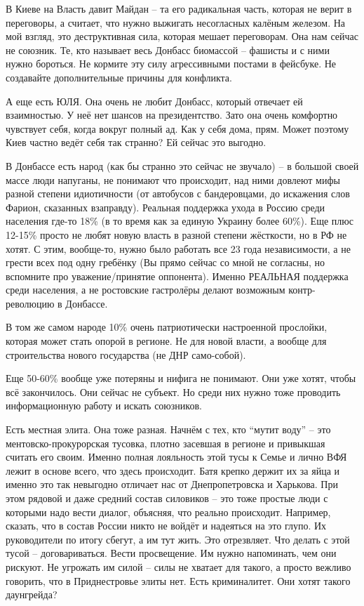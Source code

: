 В Киеве на Власть давит Майдан – та его радикальная часть, которая не верит в
переговоры, а считает, что нужно выжигать несогласных калёным железом. На мой
взгляд, это деструктивная сила, которая мешает переговорам. Она нам сейчас не
союзник. Те, кто называет весь Донбасс биомассой – фашисты и с ними нужно
бороться. Не кормите эту силу агрессивными постами в фейсбуке. Не создавайте
дополнительные причины для конфликта.

А еще есть ЮЛЯ. Она очень не любит Донбасс, который отвечает ей взаимностью. У
неё нет шансов на президентство. Зато она очень комфортно чувствует себя, когда
вокруг полный ад. Как у себя дома, прям. Может поэтому Киев частно ведёт себя
так странно? Ей сейчас это выгодно.

В Донбассе есть народ (как бы странно это сейчас не звучало) – в большой своей
массе люди напуганы, не понимают что происходит, над ними довлеют мифы разной
степени идиотичности (от автобусов с бандеровцами, до искажения слов Фарион,
сказанных взаправду). Реальная поддержка ухода в Россию среди населения где-то
18\% (в то время как за единую Украину более 60\%). Еще плюс 12-15\% просто не
любят новую власть в разной степени жёсткости, но в РФ не хотят. С этим,
вообще-то, нужно было работать все 23 года независимости, а не грести всех под
одну гребёнку (Вы прямо сейчас со мной не согласны, но вспомните про
уважение/принятие оппонента). Именно РЕАЛЬНАЯ поддержка среди населения, а не
ростовские гастролёры делают возможным контр-революцию в Донбассе.

В том же самом народе 10\% очень патриотически настроенной прослойки, которая
может стать опорой в регионе. Не для новой власти, а вообще для строительства
нового государства (не ДНР само-собой).

Еще 50-60\% вообще уже потеряны и нифига не понимают. Они уже хотят, чтобы всё
закончилось. Они сейчас не субъект. Но среди них нужно тоже проводить
информационную работу и искать союзников.

Есть местная элита. Она тоже разная. Начнём с тех, кто “мутит воду” – это
ментовско-прокурорская тусовка, плотно засевшая в регионе и привыкшая считать
его своим. Именно полная лояльность этой тусы к Семье и лично ВФЯ лежит в
основе всего, что здесь происходит. Батя крепко держит их за яйца и именно это
так невыгодно отличает нас от Днепропетровска и Харькова. При этом рядовой и
даже средний состав силовиков – это тоже простые люди с которыми надо вести
диалог, объясняя, что реально происходит. Например, сказать, что в состав
России никто не войдёт и надеяться на это глупо. Их руководители по итогу
сбегут, а им тут жить. Это отрезвляет. Что делать с этой тусой –
договариваться. Вести просвещение. Им нужно напоминать, чем они рискуют. Не
угрожать им силой – силы не хватает для такого, а просто вежливо говорить, что
в Приднестровье элиты нет. Есть криминалитет. Они хотят такого даунгрейда?

